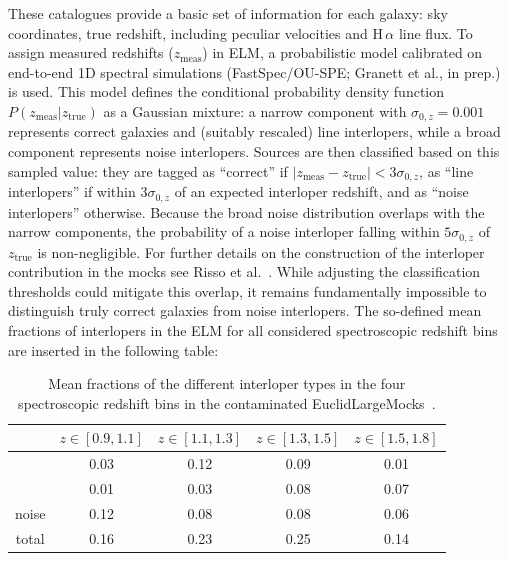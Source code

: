 \documentclass[12pt,a4paper,oneside]{report}
\begin{document}
These catalogues provide a basic set of information for each galaxy: sky coordinates, true redshift, including peculiar velocities and $\mathrm{H}\,\alpha$ line flux. To assign measured redshifts ($z_{\mathrm{meas}}$) in ELM, a probabilistic model calibrated on end-to-end 1D spectral simulations (FastSpec/OU-SPE; Granett et al., in prep.) is used. This model defines the conditional probability density function $P(z_{\mathrm{meas}}|z_{\mathrm{true}})$ as a Gaussian mixture: a narrow component with $\sigma_{0,z} = 0.001$ represents correct galaxies and (suitably rescaled) line interlopers, while a broad component represents noise interlopers. Sources are then classified based on this sampled value: they are tagged as “correct” if $|z_{\mathrm{meas}} - z_{\mathrm{true}}| < 3\sigma_{0,z}$, as “line interlopers” if within $3\sigma_{0,z}$ of an expected interloper redshift, and as “noise interlopers” otherwise. Because the broad noise distribution overlaps with the narrow components, the probability of a noise interloper falling within $5\sigma_{0,z}$ of $z_{\text{true}}$ is non-negligible. For further details on the construction of the interloper contribution in the mocks see Risso et al.~\cite{IlariaR}. While adjusting the classification thresholds could mitigate this overlap, it remains fundamentally impossible to distinguish truly correct galaxies from noise interlopers. The so-defined mean fractions of interlopers in the ELM for all considered spectroscopic redshift bins are inserted in the following table:
\begin{table}[ht]
    \centering
    \begin{tabular}{|c|c|c|c|c|}
        \hline
         & $z \in [0.9, 1.1]$ & $z \in [1.1, 1.3]$ & $z \in [1.3, 1.5]$ & $z \in [1.5, 1.8]$ \\
        \hline
        [O\,\textsc{iii}] & 0.03 & 0.12 & 0.09 & 0.01 \\
        \hline
        [S\,\textsc{iii}] & 0.01 & 0.03 & 0.08 & 0.07 \\
        \hline
        noise & 0.12 & 0.08 & 0.08 & 0.06 \\
        \hline
        \hline
        total & 0.16 & 0.23 & 0.25 & 0.14 \\
        \hline
      \end{tabular}
      \caption{Mean fractions of the diﬀerent interloper types in the four spectroscopic redshift bins in the contaminated EuclidLargeMocks~\cite{IlariaR}.}
    \label{tab:InterloperFraction}
\end{table}
\end{document}
